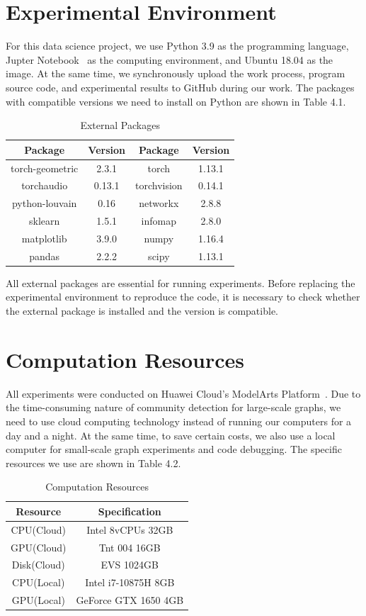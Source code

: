 \documentclass[ %
                    author={Tengyao Tu},
                supervisor={Dr. James Pope},
                    degree={MSc},
                     title={A New Perspective on Graph Community Detection: Combining Traditional Methods with Deep Learning Approaches},
                  subtitle={Applying to Telecom Networks and Diverse Datasets},
                      type={},
                      year={2024}]{dissertation}
\begin{document}
\section{Experimental Environment}
For this data science project, we use Python 3.9 as the programming language, Jupter Notebook~\cite{kluyver2016jupyter} as the computing environment, and Ubuntu 18.04 as the image. At the same time, we synchronously upload the work process, program source code, and experimental results to GitHub during our work. The packages with compatible versions we need to install on Python are shown in Table 4.1.
\begin{table}[!htbp] 
\centering 
\label{External Packages} 
\caption{External Packages} 
\vspace{5pt} 
\begin{tabular}{cccc} 
\hline 
Package &Version&Package&Version \\ 
\hline
torch-geometric &2.3.1&torch&1.13.1 \\
torchaudio &0.13.1&torchvision&0.14.1 \\
python-louvain &0.16&networkx&2.8.8 \\
sklearn &1.5.1&infomap&2.8.0 \\
matplotlib &3.9.0&numpy&1.16.4 \\
pandas & 2.2.2&scipy&1.13.1\\
\hline
\end{tabular}
\end{table}

All external packages are essential for running experiments. Before replacing the experimental environment to reproduce the code, it is necessary to check whether the external package is installed and the version is compatible.

\section{Computation Resources}
All experiments were conducted on Huawei Cloud's ModelArts Platform~\cite{hu2021optimal}. Due to the time-consuming nature of community detection for large-scale graphs, we need to use cloud computing technology instead of running our computers for a day and a night. At the same time, to save certain costs, we also use a local computer for small-scale graph experiments and code debugging. The specific resources we use are shown in Table 4.2.
\begin{table}[!htbp] 
\centering 
\label{Computation Resources} 
\caption{Computation Resources} 
\vspace{5pt} 
\begin{tabular}{cc} 
\hline 
Resource &Specification \\ 
\hline
CPU(Cloud) &Intel 8vCPUs 32GB \\
GPU(Cloud) &Tnt 004 16GB \\
Disk(Cloud) &EVS 1024GB \\
CPU(Local) &Intel i7-10875H 8GB\\
GPU(Local) &GeForce GTX 1650 4GB \\
\hline
\end{tabular}
\end{table}
\end{document}
